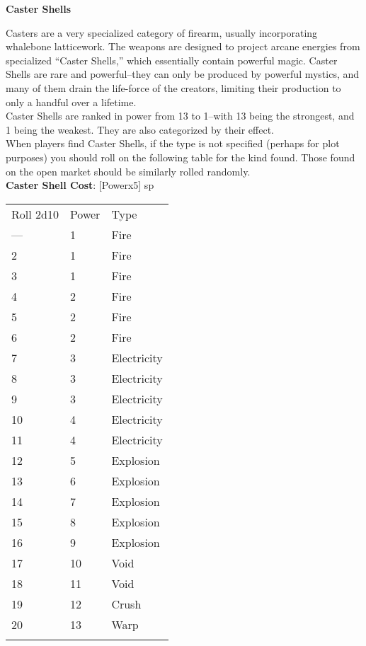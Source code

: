 \documentclass[a4paper, twocolumn, openany]{book}
\begin{document}
{{\bfseries Caster Shells\\}

Casters are a very specialized category of firearm, usually incorporating whalebone latticework.
The weapons are designed to project arcane energies from specialized “Caster Shells,” which
essentially contain powerful magic. Caster Shells are rare and powerful--they can only be
produced by powerful mystics, and many of them drain the life-force of the creators, limiting their
production to only a handful over a lifetime.\\

Caster Shells are ranked in power from 13 to 1--with 13 being the strongest, and 1 being the
weakest. They are also categorized by their effect.\\
When players find Caster Shells, if the type is not specified (perhaps for plot purposes) you
should roll on the following table for the kind found. Those found on the open market should be
similarly rolled randomly.\\

{\bfseries Caster Shell Cost}: [Powerx5] sp\\

{\centering
\begin{tabular}{lll}
Roll 2d10 & Power & Type \\
--- & 1 	& Fire 			\\
2 	& 1 	& Fire 			\\
3 	& 1 	& Fire 			\\
4 	& 2 	& Fire 			\\
5 	& 2 	& Fire 			\\
6 	& 2 	& Fire 			\\
7 	& 3 	& Electricity 	\\
8 	& 3 	& Electricity 	\\
9 	& 3 	& Electricity 	\\
10 	& 4 	& Electricity 	\\
11 	& 4 	& Electricity 	\\
12 	& 5 	& Explosion 	\\
13 	& 6 	& Explosion 	\\
14 	& 7 	& Explosion 	\\
15 	& 8 	& Explosion 	\\
16 	& 9 	& Explosion 	\\
17 	& 10 	& Void 			\\
18 	& 11 	& Void 			\\
19 	& 12 	& Crush 		\\
20 	& 13 	& Warp 			\\
\\\hline
\end{tabular}\\[\baselineskip] }

}
\end{document}
